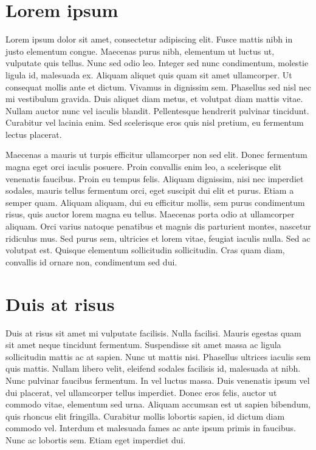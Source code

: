 \documentclass{article}
\begin{document}
\section{Lorem ipsum}

Lorem ipsum dolor sit amet, consectetur adipiscing elit.
Fusce mattis nibh in justo elementum congue.
Maecenas purus nibh, elementum ut luctus ut, vulputate quis tellus.
Nunc sed odio leo.
Integer sed nunc condimentum, molestie ligula id, malesuada ex.
Aliquam aliquet quis quam sit amet ullamcorper.
Ut consequat mollis ante et dictum.
Vivamus in dignissim sem.
Phasellus sed nisl nec mi vestibulum gravida.
Duis aliquet diam metus, et volutpat diam mattis vitae.
Nullam auctor nunc vel iaculis blandit.
Pellentesque hendrerit pulvinar tincidunt.
Curabitur vel lacinia enim.
Sed scelerisque eros quis nisl pretium, eu fermentum lectus placerat.

Maecenas a mauris ut turpis efficitur ullamcorper non sed elit.
Donec fermentum magna eget orci iaculis posuere.
Proin convallis enim leo, a scelerisque elit venenatis faucibus.
Proin eu tempus felis.
Aliquam dignissim, nisi nec imperdiet sodales, mauris tellus fermentum orci, eget suscipit dui elit et purus.
Etiam a semper quam.
Aliquam aliquam, dui eu efficitur mollis, sem purus condimentum risus, quis auctor lorem magna eu tellus.
Maecenas porta odio at ullamcorper aliquam.
Orci varius natoque penatibus et magnis dis parturient montes, nascetur ridiculus mus.
Sed purus sem, ultricies et lorem vitae, feugiat iaculis nulla.
Sed ac volutpat est.
Quisque elementum sollicitudin sollicitudin.
Cras quam diam, convallis id ornare non, condimentum sed dui.

\section{Duis at risus}

Duis at risus sit amet mi vulputate facilisis.
Nulla facilisi.
Mauris egestas quam sit amet neque tincidunt fermentum.
Suspendisse sit amet massa ac ligula sollicitudin mattis ac at sapien.
Nunc ut mattis nisi.
Phasellus ultrices iaculis sem quis mattis.
Nullam libero velit, eleifend sodales facilisis id, malesuada at nibh.
Nunc pulvinar faucibus fermentum.
In vel luctus massa.
Duis venenatis ipsum vel dui placerat, vel ullamcorper tellus imperdiet.
Donec eros felis, auctor ut commodo vitae, elementum sed urna.
Aliquam accumsan est ut sapien bibendum, quis rhoncus elit fringilla.
Curabitur mollis lobortis sapien, id dictum diam commodo vel.
Interdum et malesuada fames ac ante ipsum primis in faucibus.
Nunc ac lobortis sem.
Etiam eget imperdiet dui.
\end{document}
